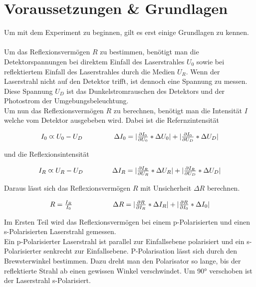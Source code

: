 \documentclass[12pt,a4paper,twoside]{article}
\begin{document}
\section{Voraussetzungen \& Grundlagen} %
Um mit dem Experiment zu beginnen, gilt es erst einige Grundlagen zu kennen. 
\\
\\
Um das Reflexionsvermögen $R$ zu bestimmen, benötigt man die Detektorspannungen bei direktem Einfall des Laserstrahles $U_0$ sowie bei reflektiertem Einfall des Laserstrahles durch die Medien $U_R$. 
Wenn der Laserstrahl nicht auf den Detektor trifft, ist dennoch eine Spannung zu messen. Diese Spannung $U_D$ ist das Dunkelstromrauschen des Detektors und der Photostrom der Umgebungsbeleuchtung. 
\\
Um nun das Reflexionsvermögen $R$ zu berechnen, benötigt man die Intensität $I$ welche vom Detektor ausgebeben wird. 
Dabei ist die Refernzintensität 

\begin{equation}
    \label{eq:Refernzintensität}
    \centerline{$I_0 \varpropto U_0 - U_D$ \\ $\Delta I_0 = \vert \frac{\partial I_0}{\partial U_0} * \Delta U_0 \vert + \vert \frac{\partial I_0}{\partial U_D} * \Delta U_D \vert$}
\end{equation}

\noindent
und die Reflexionsintensität 

\begin{equation}
    \label{eq:Reflexionsintensität}
    \centerline{$I_R \varpropto U_R - U_D$ \\ $\Delta I_R = \vert \frac{\partial I_R}{\partial U_R} * \Delta U_R \vert + \vert \frac{\partial I_R}{\partial U_D} * \Delta U_D \vert$}
\end{equation}

\noindent 
Daraus lässt sich das Reflexionsvermögen $R$ mit Unsicherheit $\Delta R$ berechnen. 

\begin{equation}
    \label{eq:Reflexionsvermögen}
    \centerline{$R=\frac{I_R}{I_0}$ \\ $\Delta R = \vert \frac{\partial R}{\partial I_R} * \Delta I_R \vert + \vert \frac{\partial R}{\partial I_0} * \Delta I_0 \vert$}
\end{equation}

\noindent
Im Ersten Teil wird das Reflexionsvermögen bei einem p-Polarisierten und einen s-Polarisierten Laserstrahl gemessen. 
\\
Ein p-Polarisierter Laserstrahl ist parallel zur Einfallsebene polarisiert und ein s-Polarisierter senkrecht zur Einfallsebene. 
P-Polarisation lässt sich durch den Brewsterwinkel bestimmen. Dazu dreht man den Polarisator so lange, bis der reflektierte Strahl ab einen gewissen Winkel verschwindet. 
Um 90° verschoben ist der Laserstrahl s-Polarisiert. 
\end{document}
